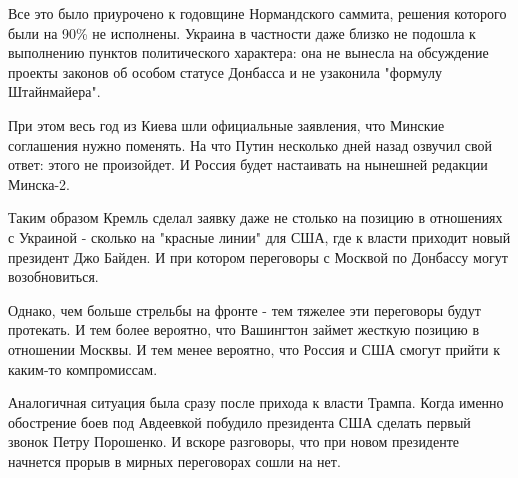 Все это было приурочено к годовщине Нормандского саммита, решения которого были
на 90\% не исполнены. Украина в частности даже близко не подошла к выполнению
пунктов политического характера: она не вынесла на обсуждение проекты законов
об особом статусе Донбасса и не узаконила "формулу Штайнмайера". 

При этом весь год из Киева шли официальные заявления, что Минские соглашения
нужно поменять. На что Путин несколько дней назад озвучил свой ответ: этого не
произойдет. И Россия будет настаивать на нынешней редакции Минска-2. 

Таким образом Кремль сделал заявку даже не столько на позицию в отношениях с
Украиной - сколько на "красные линии" для США, где к власти приходит новый
президент Джо Байден. И при котором переговоры с Москвой по Донбассу могут
возобновиться. 

Однако, чем больше стрельбы на фронте - тем тяжелее эти переговоры будут
протекать. И тем более вероятно, что Вашингтон займет жесткую позицию в
отношении Москвы. И тем менее вероятно, что Россия и США смогут прийти к
каким-то компромиссам.

Аналогичная ситуация была сразу после прихода к власти Трампа. Когда именно
обострение боев под Авдеевкой побудило президента США сделать первый звонок
Петру Порошенко. И вскоре разговоры, что при новом президенте начнется прорыв в
мирных переговорах сошли на нет.
